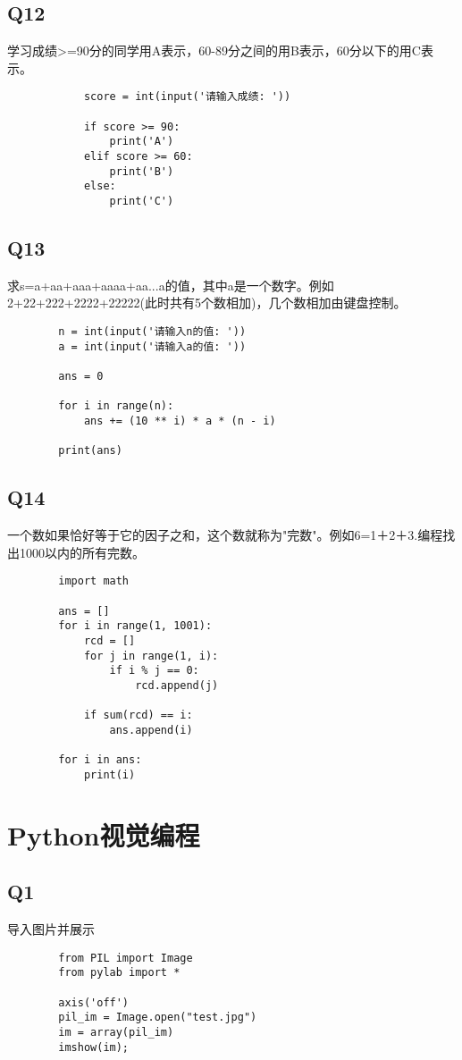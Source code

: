 \documentclass{article}
\begin{document}
    \subsection{Q12}
    学习成绩>=90分的同学用A表示，60-89分之间的用B表示，60分以下的用C表示。
        \begin{verbatim}
            score = int(input('请输入成绩: '))

            if score >= 90:
                print('A')
            elif score >= 60:
                print('B')
            else:
                print('C')
        \end{verbatim}

    \subsection{Q13}
    求s=a+aa+aaa+aaaa+aa...a的值，其中a是一个数字。例如2+22+222+2222+22222(此时共有5个数相加)，几个数相加由键盘控制。
    \begin{verbatim}
        n = int(input('请输入n的值: '))
        a = int(input('请输入a的值: '))
        
        ans = 0
        
        for i in range(n):
            ans += (10 ** i) * a * (n - i)
        
        print(ans)
    \end{verbatim}

    \subsection{Q14}
    一个数如果恰好等于它的因子之和，这个数就称为"完数"。例如6=1＋2＋3.编程找出1000以内的所有完数。
    \begin{verbatim}
        import math

        ans = []
        for i in range(1, 1001):
            rcd = []
            for j in range(1, i):
                if i % j == 0:
                    rcd.append(j)
        
            if sum(rcd) == i:
                ans.append(i)
        
        for i in ans:
            print(i)
    \end{verbatim}
\section{Python视觉编程}
    \subsection{Q1}
    导入图片并展示
    \begin{verbatim}
        from PIL import Image
        from pylab import *

        axis('off')
        pil_im = Image.open("test.jpg")
        im = array(pil_im)
        imshow(im);
    \end{verbatim}
\end{document}
